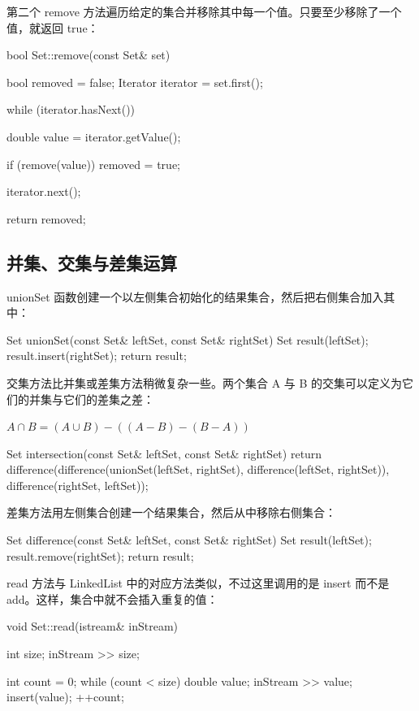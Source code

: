 第二个 remove 方法遍历给定的集合并移除其中每一个值。只要至少移除了一个值，就返回 true：

\begin{codebox}
bool Set::remove(const Set& set) {
  bool removed = false;
  Iterator iterator = set.first();

  while (iterator.hasNext()) {
    double value = iterator.getValue();

    if (remove(value)) {
      removed = true;
    }

    iterator.next();
  }

  return removed;
}
\end{codebox}

\subsection{并集、交集与差集运算}

unionSet 函数创建一个以左侧集合初始化的结果集合，然后把右侧集合加入其中：

\begin{codebox}
Set unionSet(const Set& leftSet, const Set& rightSet) {
  Set result(leftSet);
  result.insert(rightSet);
  return result;
}
\end{codebox}

交集方法比并集或差集方法稍微复杂一些。两个集合 A 与 B 的交集可以定义为它们的并集与它们的差集之差：

$A \cap B = (A \cup B) - ((A - B) - (B - A))$

\begin{codebox}
Set intersection(const Set& leftSet, const Set& rightSet) {
  return difference(difference(unionSet(leftSet, rightSet),
                               difference(leftSet, rightSet)),
                    difference(rightSet, leftSet));
}
\end{codebox}

差集方法用左侧集合创建一个结果集合，然后从中移除右侧集合：

\begin{codebox}
Set difference(const Set& leftSet, const Set& rightSet) {
  Set result(leftSet);
  result.remove(rightSet);
  return result;
}
\end{codebox}

read 方法与 LinkedList 中的对应方法类似，不过这里调用的是 insert 而不是 add。这样，集合中就不会插入重复的值：

\begin{codebox}
void Set::read(istream& inStream) {
  int size;
  inStream >> size;

  int count = 0;
  while (count < size) {
    double value;
    inStream >> value;
    insert(value);
    ++count;
  }
}
\end{codebox}

